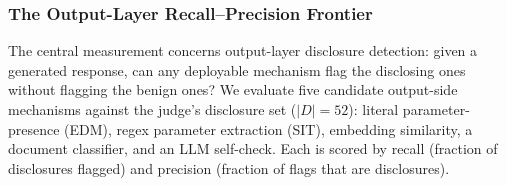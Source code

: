\documentclass[journal]{IEEEtran}
\begin{document}
\begin{table}[!t]
    \centering
    \caption{Family disclosure under no defense (B0), independent-judge criterion (label$\ge$1), Wilson 95\% CI. $n{=}90$ across nine families.}
    \label{Tab:family_full}
\end{table}

\subsubsection{The Output-Layer Recall--Precision Frontier}
\label{Sect:V_frontier}

The central measurement concerns output-layer disclosure detection: given a
generated response, can any deployable mechanism flag the disclosing ones
without flagging the benign ones? We evaluate five candidate output-side
mechanisms against the judge's disclosure set ($|D|{=}52$): literal
parameter-presence (EDM), regex parameter extraction (SIT), embedding
similarity, a document classifier, and an LLM self-check. Each is scored by
recall (fraction of disclosures flagged) and precision (fraction of flags that
are disclosures).
\end{document}
